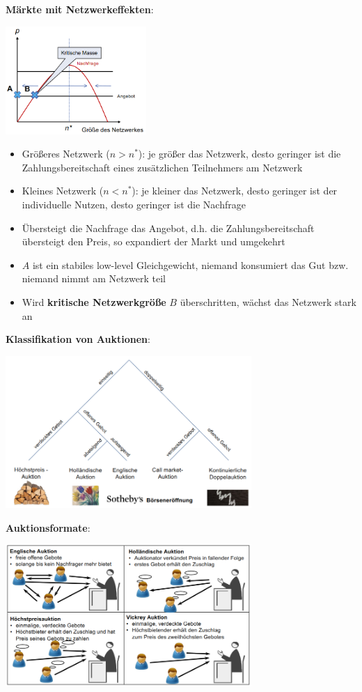 \textbf{Märkte mit Netzwerkeffekten}:
\begin{center}
	\includegraphics[width=0.4\textwidth]{images/netzwerkeffekte.png}
\end{center}
\begin{itemize}
	\item Größeres Netzwerk ($n>n^*$): je größer das Netzwerk, desto geringer ist die Zahlungsbereitschaft eines zusätzlichen Teilnehmers am Netzwerk
	\item Kleines Netzwerk ($n<n^*$): je kleiner das Netzwerk, desto geringer ist der	individuelle Nutzen, desto geringer ist die Nachfrage 
	\item Übersteigt die Nachfrage das Angebot, d.h. die Zahlungsbereitschaft übersteigt den Preis, so expandiert der Markt und umgekehrt
	\item $A$ ist ein stabiles low-level Gleichgewicht, niemand konsumiert das Gut bzw. niemand nimmt am Netzwerk teil
	\item Wird \textbf{kritische Netzwerkgröße} $B$ überschritten, wächst das Netzwerk stark an
\end{itemize}

\textbf{Klassifikation von Auktionen}: 
\begin{center}
	\includegraphics[width=0.7\textwidth]{images/auktionsformate.png}
\end{center}

\pagebreak
\textbf{Auktionsformate}:
\begin{center}
	\includegraphics[width=0.7\textwidth]{images/auktionsformate-2.png}
\end{center}

